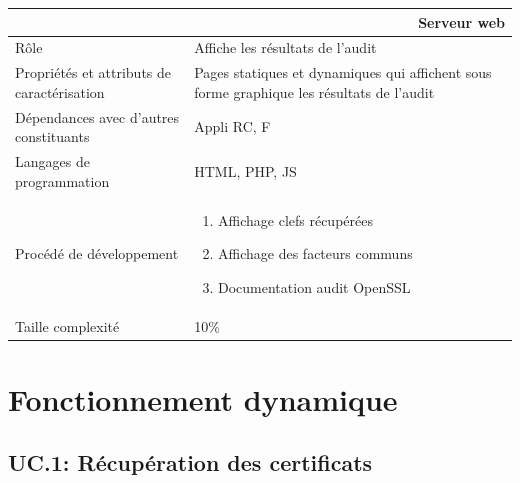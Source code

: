 \documentclass[a4paper,11pt,french]{article}
\begin{document}
\begin{center}
	\vspace*{0.7cm}
	\begin{tabularx}{16cm}{|l|X|}
	\hline
	\multicolumn{2}{|r|}{\textbf{Serveur web}}\\
	\hline
	R\^ole & Affiche les résultats de l'audit \\
	\hline
	Propriétés et attributs de caractérisation & Pages statiques et dynamiques qui affichent sous forme graphique les résultats de l'audit \\
	\hline
	Dépendances avec d'autres constituants & Appli RC, F \\
	\hline
	Langages de programmation & HTML, PHP, JS\\
	\hline
	Procédé de développement & \begin{enumerate} \item Affichage clefs récupérées \item Affichage des facteurs communs \item Documentation audit OpenSSL\end{enumerate}\\
	\hline
	Taille complexité & 10\%\\
	\hline
	\end{tabularx}
\end{center}

\newpage
\section{Fonctionnement dynamique}

\subsection{UC.1: Récupération des certificats}
\end{document}

